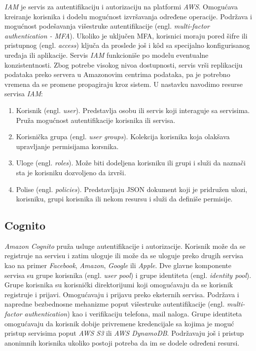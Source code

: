 \documentclass[12pt,oneside]{memoir}
\begin{document}
\emph{IAM} je servis za autentifikaciju i autorizaciju na platformi \emph{AWS}. Omogućava kreiranje korisnika i dodelu mogućnost izvršavanja određene operacije. Podržava i mogućnost podešavanja višestruke autentifikacije (engl. \emph{multi-factor authentication - MFA}). Ukoliko je uključen MFA, korisnici moraju pored šifre ili pristupnog (engl. \emph{access}) ključa da proslede još i kôd sa specijalno konfigurisanog uređaja ili aplikacije. Servis \emph{IAM} funkcioniše po modelu eventualne konzistentnosti. Zbog potrebe visokog nivoa dostupnosti, servis vrši replikaciju podataka preko servera u Amazonovim centrima podataka, pa je potrebno vremena da se promene propagiraju kroz sistem. U nastavku navodimo resurse servisa \emph{IAM}:
\begin{enumerate}
  \item Korisnik (engl. \emph{user}). Predstavlja osobu ili servis koji interaguje sa servisima. Pruža mogućnost autentifikacije korisnika ili servisa.
  \item Korisnička grupa (engl. \emph{user groups}). Kolekcija korisnika koja olakšava upravljanje permisijama korsnika.
  \item Uloge (engl. \emph{roles}). Može biti dodeljena korisniku ili grupi i služi da naznači sta je korisniku dozvoljeno da izvrši.
  \item Polise (engl. \emph{policies}). Predstavljaju JSON dokument koji je pridružen ulozi, korisniku, grupi korisnika ili nekom resursu i služi da definiše permisije.
\end{enumerate}

\subsection{Cognito}
  
\emph{Amazon Cognito} pruža usluge autentifikacije i autorizacije. Korisnik može da se registruje na servisu i zatim uloguje ili može da se uloguje preko drugih servisa kao na primer \emph{Facebook}, \emph{Amazon}, \emph{Google} ili \emph{Apple}. Dve glavne komponente servisa su grupe korisnika (engl. \emph{user pool}) i grupe identiteta (engl. \emph{identity pool}). Grupe korisnika su korisnički direktorijumi koji omogućavaju da se korisnik registruje i prijavi. Omogućavaju i prijavu preko eksternih servisa. Podržava i napredne bezbednosne mehanizme poput višestruke autentifikacije (engl. \emph{multi-factor authentication}) kao i verifikaciju telefona, mail naloga. Grupe identiteta omogućavaju da korisnik dobije privremene kredencijale sa kojima je moguć pristup  servisima poput \emph{AWS S3} ili \emph{AWS DynamoDB}. Podržavaju još i pristup anonimnih korisnika ukoliko postoji potreba da im se dodele određeni resursi.
\end{document}

